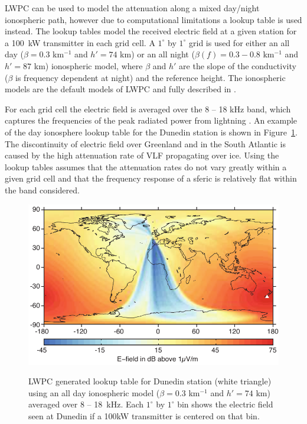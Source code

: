 LWPC can be used to model the attenuation along a mixed day/night ionospheric path, however due to computational limitations a lookup table is used instead.
The lookup tables model the received electric field at a given station for a 100~kW transmitter in each grid cell.
A $1^{\circ}$ by $1^{\circ}$ grid is used for either an all day ($\beta=0.3$ km$^{-1}$ and $h'=74$ km) or an all night ($\beta(f)=0.3-0.8$ km$^{-1}$ and $h'=87$ km) ionospheric model, where $\beta$ and $h'$ are the slope of the conductivity ($\beta$ is frequency dependent at night) and the reference height.
The ionospheric models are the default models of LWPC and fully described in \citet{Ferguson1998}.

For each grid cell the electric field is averaged over the 8 -- 18 kHz band, which captures the frequencies of the peak radiated power from lightning \citep{Volland1995}.
An example of the day ionosphere lookup table for the Dunedin station is shown in Figure~\ref{intro:fig:lookup}.
The discontinuity of electric field over Greenland and in the South Atlantic is caused by the high attenuation rate of VLF propagating over ice.
Using the lookup tables assumes that the attenuation rates do not vary greatly within a given grid cell and that the frequency response of a sferic is relatively flat within the band considered.

\begin{figure}[ht!]
	\centering
	\includegraphics[scale=1]{Introduction/Figures/lwpc_Lookup.pdf}\\
	\caption{LWPC generated lookup table for Dunedin station (white triangle) using an all day ionospheric model ($	\beta=0.3$ km$^{-1}$ and $h'=74$ km) averaged over 8 -- 18~kHz. Each $1^{\circ}$ by $1^{\circ}$ bin shows the electric field seen at Dunedin if a 100kW transmitter is centered on that bin.}
	\label{intro:fig:lookup}
\end{figure}

